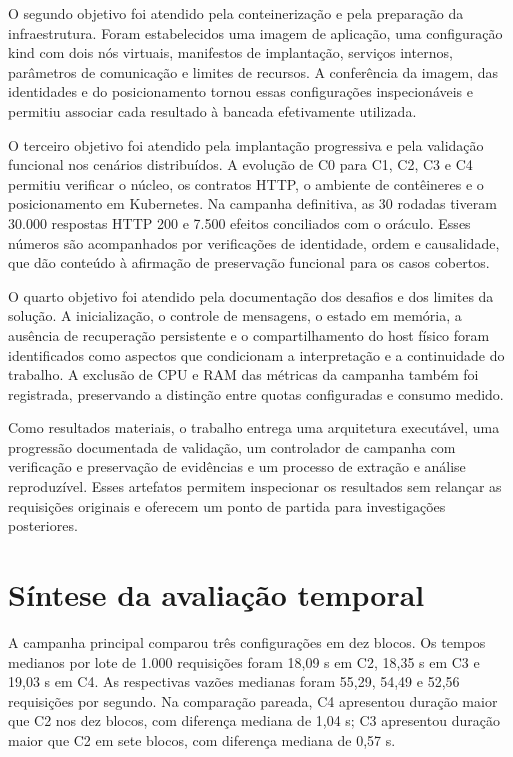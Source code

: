 O segundo objetivo foi atendido pela conteinerização e pela preparação da infraestrutura. Foram estabelecidos uma imagem de aplicação, uma configuração kind com dois nós virtuais, manifestos de implantação, serviços internos, parâmetros de comunicação e limites de recursos. A conferência da imagem, das identidades e do posicionamento tornou essas configurações inspecionáveis e permitiu associar cada resultado à bancada efetivamente utilizada.

O terceiro objetivo foi atendido pela implantação progressiva e pela validação funcional nos cenários distribuídos. A evolução de C0 para C1, C2, C3 e C4 permitiu verificar o núcleo, os contratos HTTP, o ambiente de contêineres e o posicionamento em Kubernetes. Na campanha definitiva, as 30 rodadas tiveram 30.000 respostas HTTP 200 e 7.500 efeitos conciliados com o oráculo. Esses números são acompanhados por verificações de identidade, ordem e causalidade, que dão conteúdo à afirmação de preservação funcional para os casos cobertos.

O quarto objetivo foi atendido pela documentação dos desafios e dos limites da solução. A inicialização, o controle de mensagens, o estado em memória, a ausência de recuperação persistente e o compartilhamento do host físico foram identificados como aspectos que condicionam a interpretação e a continuidade do trabalho. A exclusão de CPU e RAM das métricas da campanha também foi registrada, preservando a distinção entre quotas configuradas e consumo medido.

Como resultados materiais, o trabalho entrega uma arquitetura executável, uma progressão documentada de validação, um controlador de campanha com verificação e preservação de evidências e um processo de extração e análise reproduzível. Esses artefatos permitem inspecionar os resultados sem relançar as requisições originais e oferecem um ponto de partida para investigações posteriores.

\section{Síntese da avaliação temporal}

A campanha principal comparou três configurações em dez blocos. Os tempos medianos por lote de 1.000 requisições foram 18,09 s em C2, 18,35 s em C3 e 19,03 s em C4. As respectivas vazões medianas foram 55,29, 54,49 e 52,56 requisições por segundo. Na comparação pareada, C4 apresentou duração maior que C2 nos dez blocos, com diferença mediana de 1,04 s; C3 apresentou duração maior que C2 em sete blocos, com diferença mediana de 0,57 s.

